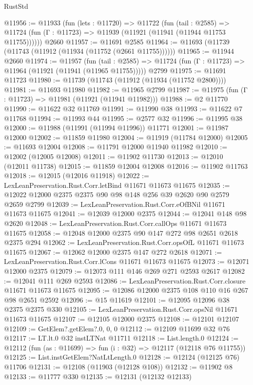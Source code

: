\begin{lexlean}{RustStd}
\begin{coremodule}
@11956 := @11933
    (fun (lets : @11720) =>
    @11722
      (fun (tail : @2585) =>
      @11724 (fun (Γ : @11723) => @11939 (@11921 (@11941 (@11944 @11753 @11755))))))
    @2660
@11957 := @11691 @2585
@11964 := @11693 (@11739 (@11743 (@11912 (@11934 (@11752 (@2661 @11755))))))
@11965 := @11944 @2660
@11974 := @11957
    (fun (tail : @2585) => @11724 (fun (Γ : @11723) => @11964 (@11921 (@11941 (@11965 @11755)))))
    @2799
@11975 := @11691 @11723
@11980 := @11739 (@11743 (@11912 (@11934 (@11752 @2800))))
@11981 := @11693 @11980
@11982 := @11965 @2799
@11987 := @11975 (fun (Γ : @11723) => @11981 (@11921 (@11941 @11982)))
@11988 := @2 @11770
@11990 := @11622 @32 @11769
@11991 := @11990 @38
@11993 := @11622 @7 @11768
@11994 := @11993 @44
@11995 := @2577 @32
@11996 := @11995 @38
@12000 := @11988 (@11991 (@11994 @11996)) @11771
@12001 := @11987 @12000
@12002 := @11859 @11980
@12004 := @11919 (@11784 @12000)
@12005 := @11693 @12004
@12008 := @11791 @12000 @11940 @11982
@12010 := @12002 (@12005 @12008)
@12011 := @11902 @11730
@12013 := @12010 (@12011 @11738)
@12015 := @11859 @12004 @12008
@12016 := @11902 @11763
@12018 := @12015 (@12016 @11918)
@12022 := LexLeanPreservation.Rust.Corr.letBind @11671 @11673 @11675
@12035 := @12022 @12000 @2375 @2375 @90 @98 @148 @256 @39 @2620 @90 @2579 @2659 @2799
@12039 := LexLeanPreservation.Rust.Corr.eOfBNil @11671 @11673 @11675
@12041 := @12039 @12000 @2375
@12044 := @12041 @148 @98 @2620
@12048 := LexLeanPreservation.Rust.Corr.callOps @11671 @11673 @11675
@12058 := @12048 @12000 @2375 @90 @147 @272 @98 @2651 @2618 @2375 @294
@12062 := LexLeanPreservation.Rust.Corr.opsOfL @11671 @11673 @11675
@12067 := @12062 @12000 @2375 @147 @272 @2618
@12071 := LexLeanPreservation.Rust.Corr.lCons @11671 @11673 @11675
@12073 := @12071 @12000 @2375
@12079 := @12073 @111 @146 @269 @271 @2593 @2617
@12082 := @12041 @111 @269 @2593
@12086 := LexLeanPreservation.Rust.Corr.closure @11671 @11673 @11675
@12095 := @12086 @12000 @2375 @108 @110 @16 @267 @98 @2651 @2592
@12096 := @15 @11619
@12101 := @12095 @12096 @38 @2375 @2375 @330
@12105 := LexLeanPreservation.Rust.Corr.opsNil @11671 @11673 @11675
@12107 := @12105 @12000 @2375
@12108 := @12101 @12107
@12109 := GetElem?.getElem?.{0, 0, 0}
@12112 := @12109 @11699 @32 @76
@12117 := LT.lt.{0} @32 instLTNat @11711
@12118 := List.length.{0}
@12124 := @12112 (fun (as : @11699) => fun (i : @32) => @12117 (@12118 @76 @11755))
@12125 := List.instGetElem?NatLtLength.{0}
@12128 := @12124 (@12125 @76) @11706
@12131 := @12108 (@11903 (@12128 @108))
@12132 := @11902 @8
@12133 := @11777 @330
@12135 := @12131 (@12132 @12133)

\end{coremodule}
\end{lexlean}
